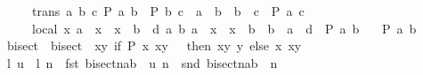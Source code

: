 \begin{isabellebody}
\ \ \ \ \ trans{\isacharcolon}{\kern0pt}\ {\isachardoublequoteopen}{\isasymAnd}a\ b\ c{\isachardot}{\kern0pt}\ P\ a\ b\ {\isasymLongrightarrow}\ P\ b\ c\ {\isasymLongrightarrow}\ a\ {\isasymle}\ b\ {\isasymLongrightarrow}\ b\ {\isasymle}\ c\ {\isasymLongrightarrow}\ P\ a\ c{\isachardoublequoteclose}\isanewline
\ \ \ \ \ local{\isacharcolon}{\kern0pt}\ {\isachardoublequoteopen}{\isasymAnd}x{\isachardot}{\kern0pt}\ a\ {\isasymle}\ x\ {\isasymLongrightarrow}\ x\ {\isasymle}\ b\ {\isasymLongrightarrow}\ {\isasymexists}d{\isachargreater}{\kern0pt}{}{\isachardot}{\kern0pt}\ {\isasymforall}a\ b{\isachardot}{\kern0pt}\ a\ {\isasymle}\ x\ {\isasymand}\ x\ {\isasymle}\ b\ {\isasymand}\ b\ {\isacharminus}{\kern0pt}\ a\ {\isacharless}{\kern0pt}\ d\ {\isasymlongrightarrow}\ P\ a\ b{\isachardoublequoteclose}\isanewline
\ \ \ {\isachardoublequoteopen}P\ a\ b{\isachardoublequoteclose}\isanewline
%
\isadelimproof
%
\endisadelimproof
%
\isatagproof
{}\isamarkupfalse%
\ {\isacharminus}{\kern0pt}\isanewline
\ \ \isamarkupfalse%
\ bisect\ \ {\isachardoublequoteopen}bisect\ {\isasymequiv}\ {\isasymlambda}{\isacharparenleft}{\kern0pt}x{\isacharcomma}{\kern0pt}y{\isacharparenright}{\kern0pt}{\isachardot}{\kern0pt}\ if\ P\ x\ {\isacharparenleft}{\kern0pt}{\isacharparenleft}{\kern0pt}x{\isacharplus}{\kern0pt}y{\isacharparenright}{\kern0pt}\ {\isacharslash}{\kern0pt}\ {}{\isacharparenright}{\kern0pt}\ then\ {\isacharparenleft}{\kern0pt}{\isacharparenleft}{\kern0pt}x{\isacharplus}{\kern0pt}y{\isacharparenright}{\kern0pt}{\isacharslash}{\kern0pt}{}{\isacharcomma}{\kern0pt}\ y{\isacharparenright}{\kern0pt}\ else\ {\isacharparenleft}{\kern0pt}x{\isacharcomma}{\kern0pt}\ {\isacharparenleft}{\kern0pt}x{\isacharplus}{\kern0pt}y{\isacharparenright}{\kern0pt}{\isacharslash}{\kern0pt}{}{\isacharparenright}{\kern0pt}{\isachardoublequoteclose}\isanewline
\ \ \isamarkupfalse%
\ l\ u\ \ {\isachardoublequoteopen}l\ n\ {\isasymequiv}\ fst\ {\isacharparenleft}{\kern0pt}{\isacharparenleft}{\kern0pt}bisect{\isacharcircum}{\kern0pt}{\isacharcircum}{\kern0pt}n{\isacharparenright}{\kern0pt}{\isacharparenleft}{\kern0pt}a{\isacharcomma}{\kern0pt}b{\isacharparenright}{\kern0pt}{\isacharparenright}{\kern0pt}{\isachardoublequoteclose}\ \ {\isachardoublequoteopen}u\ n\ {\isasymequiv}\ snd\ {\isacharparenleft}{\kern0pt}{\isacharparenleft}{\kern0pt}bisect{\isacharcircum}{\kern0pt}{\isacharcircum}{\kern0pt}n{\isacharparenright}{\kern0pt}{\isacharparenleft}{\kern0pt}a{\isacharcomma}{\kern0pt}b{\isacharparenright}{\kern0pt}{\isacharparenright}{\kern0pt}{\isachardoublequoteclose}\ \ n\isanewline

\end{isabellebody}
